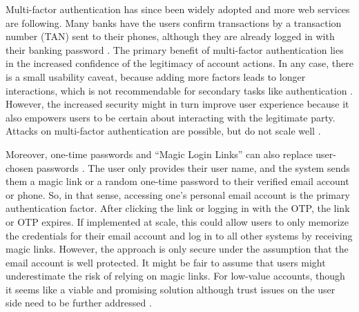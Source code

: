 	Multi-factor authentication has since been widely adopted and more web services are following. Many banks have the users confirm transactions by a transaction number (TAN) sent to their phones, although they are already logged in with their banking password \cite{Maurer2011DataTypeWarnings}. The primary benefit of multi-factor authentication lies in the increased confidence of the legitimacy of account actions. In any case, there is a small usability caveat, because adding more factors leads to longer interactions, which is not recommendable for secondary tasks like authentication \cite{Adams1999UsersEnemy}. However, the increased security might in turn improve user experience because it also empowers users to be certain about interacting with the legitimate party. Attacks on multi-factor authentication are possible, but do not scale well \cite{Herley2014CybercrimeAtScale}.
	
	Moreover, one-time passwords and ``Magic Login Links'' can also replace user-chosen passwords . The user only provides their user name, and the system sends them a magic link or a random one-time password to their verified email account or phone. So, in that sense, accessing one's personal email account is the primary authentication factor. After clicking the link or logging in with the OTP, the link or OTP expires. If implemented at scale, this could allow users to only memorize the credentials for their email account and log in to all other systems by receiving magic links. However, the approach is only secure under the assumption that the email account is well protected. It might be fair to assume that users might underestimate the risk of relying on magic links. For low-value accounts, though it seems like a viable and promising solution although trust issues on the user side need to be further addressed \cite{Ruoti2015AuthenticationMelee}.  
	
